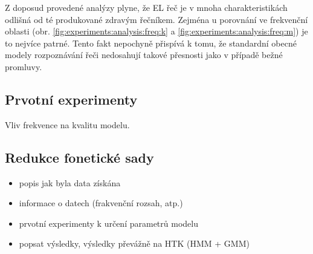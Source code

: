 Z doposud provedené analýzy plyne, že EL řeč je v mnoha charakteristikách odlišná od té produkované zdravým řečníkem. Zejména u porovnání ve frekvenční oblasti (obr. \ref{fig:experiments:analysis:freq:k} a \ref{fig:experiments:analysis:freq:m}) je to nejvíce patrné. Tento fakt nepochyně přispívá k tomu, že standardní obecné modely rozpoznávání řeči nedosahují takové přesnosti jako v případě bežné promluvy.


\subsection{Prvotní experimenty}

\begin{table}[htpb]
  \centering
  \def\arraystretch{1.5}
  \caption{Vliv frekvence na kvalitu modelu.}
\end{table}

\subsection{Redukce fonetické sady}

\begin{itemize}
  \item popis jak byla data získána
  \item informace o datech (frakvenční rozsah, atp.)
  \item prvotní experimenty k určení parametrů modelu
  \item popsat výsledky, výsledky převážně na HTK (HMM + GMM)
\end{itemize}
